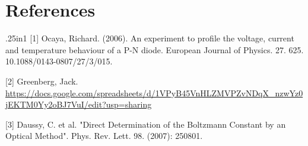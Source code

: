 \documentclass[12pt, a4paper]{article}
\begin{document}
\section{References}
	\begin{hangparas}{.25in}{1}
		[1] Ocaya, Richard. (2006). An experiment to profile the voltage, current and temperature behaviour of a P-N diode. European Journal of Physics. 27. 625. 10.1088/0143-0807/27/3/015.
		
		[2] Greenberg, Jack. \url{https://docs.google.com/spreadsheets/d/1VPyB45VnHLZMVPZvNDqX_nzwYz0jEKTM0Yy2oBJ7VuI/edit?usp=sharing}

		[3] Daussy, C. et al. "Direct Determination of the Boltzmann Constant by an Optical Method". Phys. Rev. Lett. 98. (2007): 250801.
	\end{hangparas}
\end{document}
